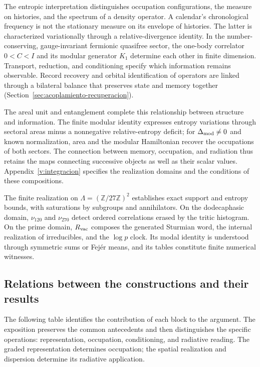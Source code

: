 The entropic interpretation distinguishes occupation configurations,
the measure on histories, and the spectrum of a density operator.
A calendar's chronological frequency is not the stationary measure
on its envelope of histories. The latter is characterized variationally
through a relative-divergence identity. In the number-conserving,
gauge-invariant fermionic quasifree sector, the one-body correlator
\(0<C<I\) and its modular generator \(K_1\) determine each other in
finite dimension. Transport, reduction, and conditioning specify which
information remains observable. Record recovery and orbital
identification of operators are linked through a bilateral balance
that preserves state and memory together
(Section~\ref{sec:acoplamiento-recuperacion}).

The areal unit and entanglement complete this relationship between
structure and information. The finite modular identity expresses
entropy variations through sectoral areas minus a nonnegative
relative-entropy deficit; for \(\Delta_{\rm mod}\ne0\) and known
normalization, area and the modular Hamiltonian recover the occupations
of both sectors. The connection between memory, occupation, and radiation thus
retains the maps connecting successive objects as well as their scalar
values. Appendix~\ref{v:integracion} specifies the realization domains
and the conditions of these compositions.

The finite realization on \(\Lambda=(\mathbb Z/27\mathbb Z)^2\)
establishes exact support and entropy bounds, with saturations by
subgroups and annihilators. On the dodecaphasic domain, \(\nu_{120}\) and
\(\nu_{270}\) detect ordered correlations erased by the tritic histogram.
On the prime domain, \(R_{\rm vac}\) composes the generated Sturmian word,
the internal realization of irreducibles, and the \(\log p\) clock. Its
modal identity is understood through symmetric sums or Fejér means, and
its tables constitute finite numerical witnesses.

\subsection*{Relations between the constructions and their results}
The following table identifies the contribution of each block to the
argument. The exposition preserves the common antecedents and then
distinguishes the specific operations: representation, occupation,
conditioning, and radiative reading. The graded representation determines occupation; the spatial realization
and dispersion determine its radiative application.

